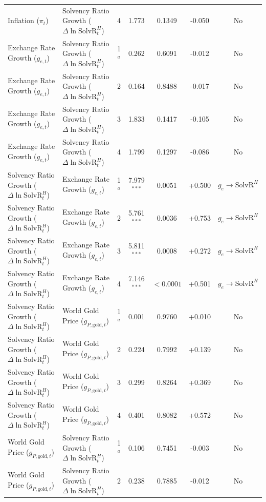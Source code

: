 \begin{table}[p]
{\begin{tabular}{llccccc}
Inflation ($\pi_t$) & Solvency Ratio Growth ($\Delta \ln \text{SolvR}_t^H$) & 4 & 1.773 & 0.1349 & -0.050 & No \\
Exchange Rate Growth ($g_{e,t}$) & Solvency Ratio Growth ($\Delta \ln \text{SolvR}_t^H$) & 1$^a$ & 0.262 & 0.6091 & -0.012 & No \\
Exchange Rate Growth ($g_{e,t}$) & Solvency Ratio Growth ($\Delta \ln \text{SolvR}_t^H$) & 2 & 0.164 & 0.8488 & -0.017 & No \\
Exchange Rate Growth ($g_{e,t}$) & Solvency Ratio Growth ($\Delta \ln \text{SolvR}_t^H$) & 3 & 1.833 & 0.1417 & -0.105 & No \\
Exchange Rate Growth ($g_{e,t}$) & Solvency Ratio Growth ($\Delta \ln \text{SolvR}_t^H$) & 4 & 1.799 & 0.1297 & -0.086 & No \\
Solvency Ratio Growth ($\Delta \ln \text{SolvR}_t^H$) & Exchange Rate Growth ($g_{e,t}$) & 1$^a$ & 7.979$^{***}$ & 0.0051 & +0.500 & $g_e \to \text{SolvR}^H$ \\
Solvency Ratio Growth ($\Delta \ln \text{SolvR}_t^H$) & Exchange Rate Growth ($g_{e,t}$) & 2 & 5.761$^{***}$ & 0.0036 & +0.753 & $g_e \to \text{SolvR}^H$ \\
Solvency Ratio Growth ($\Delta \ln \text{SolvR}_t^H$) & Exchange Rate Growth ($g_{e,t}$) & 3 & 5.811$^{***}$ & 0.0008 & +0.272 & $g_e \to \text{SolvR}^H$ \\
Solvency Ratio Growth ($\Delta \ln \text{SolvR}_t^H$) & Exchange Rate Growth ($g_{e,t}$) & 4 & 7.146$^{***}$ & $< 0.0001$ & +0.501 & $g_e \to \text{SolvR}^H$ \\
Solvency Ratio Growth ($\Delta \ln \text{SolvR}_t^H$) & World Gold Price ($g_{P,\text{gold},t}$) & 1$^a$ & 0.001 & 0.9760 & +0.010 & No \\
Solvency Ratio Growth ($\Delta \ln \text{SolvR}_t^H$) & World Gold Price ($g_{P,\text{gold},t}$) & 2 & 0.224 & 0.7992 & +0.139 & No \\
Solvency Ratio Growth ($\Delta \ln \text{SolvR}_t^H$) & World Gold Price ($g_{P,\text{gold},t}$) & 3 & 0.299 & 0.8264 & +0.369 & No \\
Solvency Ratio Growth ($\Delta \ln \text{SolvR}_t^H$) & World Gold Price ($g_{P,\text{gold},t}$) & 4 & 0.401 & 0.8082 & +0.572 & No \\
World Gold Price ($g_{P,\text{gold},t}$) & Solvency Ratio Growth ($\Delta \ln \text{SolvR}_t^H$) & 1$^a$ & 0.106 & 0.7451 & -0.003 & No \\
World Gold Price ($g_{P,\text{gold},t}$) & Solvency Ratio Growth ($\Delta \ln \text{SolvR}_t^H$) & 2 & 0.238 & 0.7885 & -0.012 & No \\

\end{tabular}}
\end{table}
